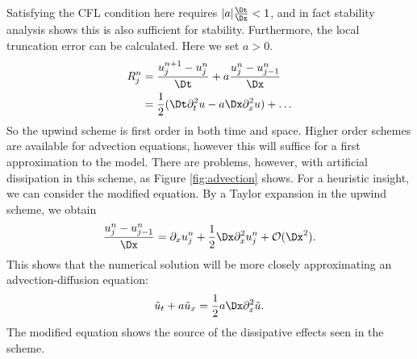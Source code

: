 Satisfying the CFL condition here requires $|a|\frac{\Dt}{\Dx} < 1$, and in fact stability analysis shows this is also sufficient for stability. Furthermore, the local truncation error can be calculated. Here we set $a>0$.
\begin{align*}
    R^n_j &= \frac{u^{n+1}_j-u^n_j}{\Dt}  + a \frac{u^n_{j}-u^n_{j-1}}{\Dx}\\
    &=\frac{1}{2}(\Dt \partial^2_t u - a\Dx \partial^2_x u)+\dots
\end{align*}
So the upwind scheme is first order in both time and space. Higher order schemes are available for advection equations, however this will suffice for a first approximation to the model. There are problems, however, with artificial dissipation in this scheme, as Figure \ref{fig:advection} shows. For a heuristic insight, we can consider the modified equation. By a Taylor expansion in the upwind scheme, we obtain
\[\frac{u^n_j - u^n_{j-1}}{\Dx} = \partial_x u^n_j + \frac{1}{2}\Dx\partial^2_{x}u^n_j + \mathcal{O}(\Dx^2). \]
This shows that the numerical solution will be more closely approximating an advection-diffusion equation:
\[\tilde{u}_t + a\tilde{u}_x = \frac{1}{2}a\Dx\partial^2_x \tilde{u}.\]
The modified equation shows the source of the dissipative effects seen in the scheme.
